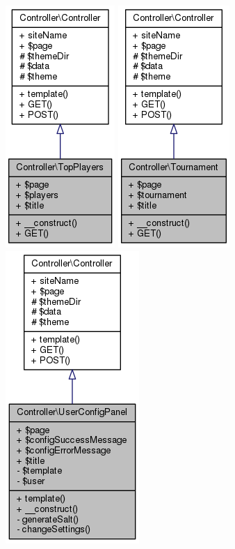 \documentclass[11pt]{article}
\begin{document}
\includegraphics[scale=0.4]{UML_Controller_1_1TopPlayers.png}
\includegraphics[scale=0.4]{UML_Controller_1_1Tournament.png}
\includegraphics[scale=0.4]{UML_Controller_1_1UserConfigPanel.png}
\end{document}
